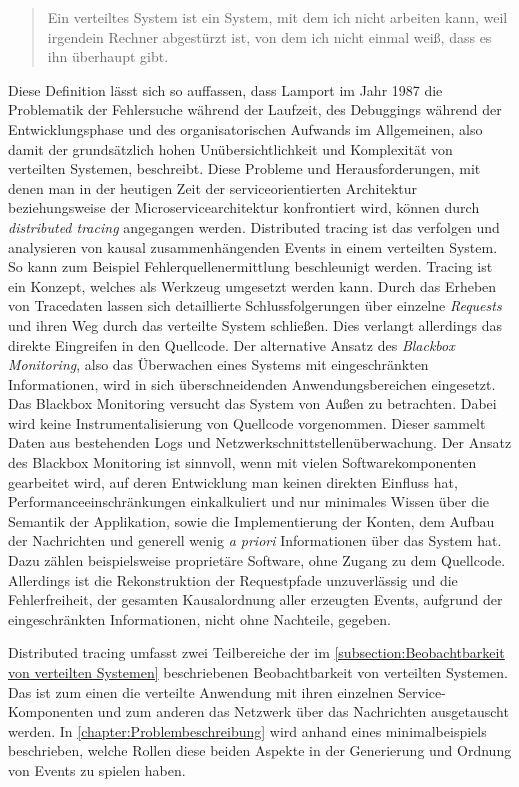 \begin{quote}
	\cbstart
	Ein verteiltes System ist ein System, mit dem ich nicht arbeiten kann, weil irgendein Rechner abgestürzt ist, von dem ich nicht einmal weiß, dass es ihn überhaupt gibt.
	\cbend
\end{quote}


Diese Definition lässt sich so auffassen, dass Lamport im Jahr 1987 die Problematik der Fehlersuche während der Laufzeit, des Debuggings während der Entwicklungsphase und des organisatorischen Aufwands im Allgemeinen, also damit der grundsätzlich hohen Unübersichtlichkeit und Komplexität von verteilten Systemen, beschreibt. Diese Probleme und Herausforderungen, mit denen man in der heutigen Zeit der serviceorientierten Architektur beziehungsweise der Microservicearchitektur konfrontiert wird, können durch \emph{distributed tracing} angegangen werden. Distributed tracing ist das verfolgen und analysieren von kausal zusammenhängenden Events in einem verteilten System. So kann zum Beispiel Fehlerquellenermittlung beschleunigt werden. Tracing ist ein Konzept, welches als Werkzeug umgesetzt werden kann. Durch das Erheben von Tracedaten lassen sich detaillierte Schlussfolgerungen über einzelne \emph{Requests} und ihren Weg durch das verteilte System schließen. Dies verlangt allerdings das direkte Eingreifen in den Quellcode. Der alternative Ansatz des \emph{Blackbox Monitoring}, also das Überwachen eines Systems mit eingeschränkten Informationen, wird in sich überschneidenden Anwendungsbereichen eingesetzt. Das Blackbox Monitoring versucht das System von Außen zu betrachten. Dabei wird keine Instrumentalisierung von Quellcode vorgenommen. Dieser sammelt Daten aus bestehenden Logs und Netzwerkschnittstellenüberwachung. Der Ansatz des Blackbox Monitoring ist sinnvoll, wenn mit vielen Softwarekomponenten gearbeitet wird, auf deren Entwicklung man keinen direkten Einfluss hat, Performanceeinschränkungen einkalkuliert und nur minimales Wissen über die Semantik der Applikation, sowie die Implementierung der Konten, dem Aufbau der Nachrichten und generell wenig \emph{a priori} Informationen über das System hat. Dazu zählen beispielsweise proprietäre Software, ohne Zugang zu dem Quellcode. Allerdings ist die Rekonstruktion der Requestpfade unzuverlässig und die Fehlerfreiheit, der gesamten Kausalordnung aller erzeugten Events, aufgrund der eingeschränkten Informationen, nicht ohne Nachteile, gegeben. 

Distributed tracing umfasst zwei Teilbereiche der im \cref{subsection:Beobachtbarkeit von verteilten Systemen} beschriebenen Beobachtbarkeit von verteilten Systemen. Das ist zum einen die verteilte Anwendung mit ihren einzelnen Service-Komponenten und zum anderen das Netzwerk über das Nachrichten ausgetauscht werden. In \cref{chapter:Problembeschreibung} wird anhand eines minimalbeispiels beschrieben, welche Rollen diese beiden Aspekte in der Generierung und Ordnung von Events zu spielen haben.


